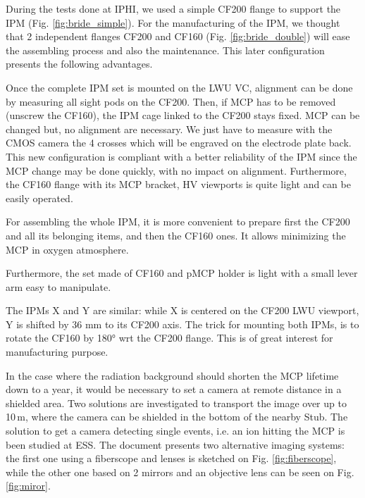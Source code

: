 \begin{refsection}
  During the tests done at IPHI, we used a simple CF200 flange to support the IPM (Fig. \ref{fig:bride_simple}). 
  For the manufacturing of the IPM, we thought that 2 independent flanges CF200 and CF160 (Fig. \ref{fig:bride_double}) will ease the assembling process and also the maintenance. This later configuration presents the following advantages. 
  
  

  Once the complete IPM set is mounted on the LWU VC, alignment can be done by measuring all sight pods on the CF200. Then, if MCP has to be removed (unscrew the CF160), the IPM cage linked to the CF200 stays fixed. MCP can be changed but, no alignment are necessary. We just have to measure with the CMOS camera the 4 crosses which will be engraved on the electrode plate back. This new configuration is compliant with a better reliability of the IPM since the MCP change may be done quickly, with no impact on alignment. Furthermore, the CF160 flange with its MCP bracket, HV viewports is quite light and can be easily operated.
  
  For assembling the whole IPM, it is more convenient to prepare first the CF200 and all its belonging items, and then the CF160 ones. It allows minimizing the MCP in oxygen atmosphere.
  
  Furthermore, the set made of CF160 and pMCP holder is light with a small lever arm easy to manipulate.
  
  The IPMs X and Y are similar: while X is centered on the CF200 LWU viewport, Y is shifted by 36 mm to its CF200 axis. The trick for mounting both IPMs, is to rotate the CF160 by 180° wrt the CF200 flange. This is of great interest for manufacturing purpose.

  In the case where the radiation background should shorten the MCP lifetime down to a year, it would be necessary to set a camera at remote distance in a shielded area. Two solutions are investigated to transport the image over up to 10\,m, where the camera can be shielded in the bottom of the nearby Stub. The solution to get a camera detecting single events, i.e. an ion hitting the MCP is been studied at ESS. The document presents two alternative imaging systems: the first one using a fiberscope and lenses is sketched on Fig. \ref{fig:fiberscope}, while the other one based on 2 mirrors and an objective lens can be seen on Fig. \ref{fig:miror}. 

  
  

\end{refsection}
